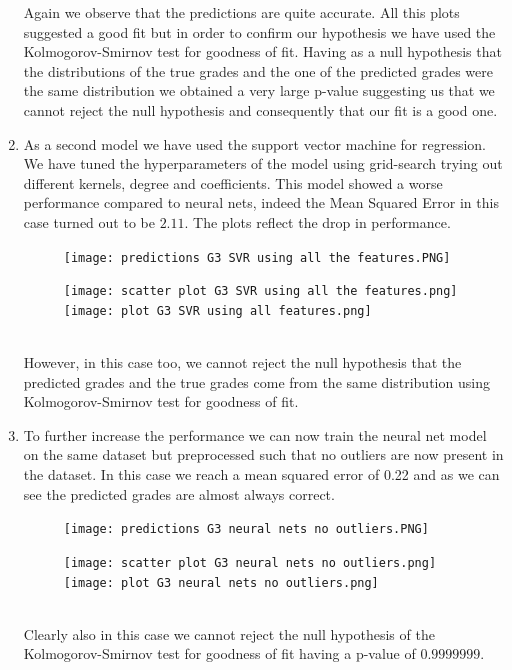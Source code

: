 \documentclass[a4paper, 11pt]{article}
\theoremstyle{definition}
\numberwithin{equation}{section}		%
\numberwithin{table}{section}				%
\begin{document}
\begin{enumerate}
Again we observe that the predictions are quite accurate.
All this plots suggested a good fit but in order to confirm our hypothesis we have used the Kolmogorov-Smirnov test for goodness of fit. Having as a null hypothesis that the distributions of the true grades and the one of the predicted grades were the same distribution we obtained a very large p-value suggesting us that we cannot reject the null hypothesis and consequently that our fit is a good one.
\item As a second model we have used the support vector machine for regression. We have tuned the hyperparameters of the model using grid-search trying out different kernels, degree and coefficients. This model showed a worse performance compared to neural nets, indeed the Mean Squared Error in this case turned out to be $2.11$. The plots reflect the drop in performance.
\newline
\begin{figure}[h]\centering
\texttt{[image: predictions G3 SVR using all the features.PNG]}
\end{figure}
\begin{figure}[h]\centering
\texttt{[image: scatter plot G3 SVR using all the features.png]}
\texttt{[image: plot G3 SVR using all features.png]}
\end{figure}\\
However, in this case too, we cannot reject the null hypothesis that the predicted grades and the true grades come from the same distribution using Kolmogorov-Smirnov test for goodness of fit.
\newline
\item To further increase the performance we can now train the neural net model on the same dataset but preprocessed such that no outliers are now present in the dataset. In this case we reach a mean squared error of 0.22 and as we can see the predicted grades are almost always correct.\\
\begin{figure}[H]\centering
\texttt{[image: predictions G3 neural nets no outliers.PNG]}
\end{figure}
\begin{figure}[h]\centering
\texttt{[image: scatter plot G3 neural nets no outliers.png]}
\texttt{[image: plot G3 neural nets no outliers.png]}
\end{figure}\\
Clearly also in this case we cannot reject the null hypothesis of the Kolmogorov-Smirnov test for goodness of fit having a p-value of $0.9999999$.

\end{enumerate}
\end{document}
